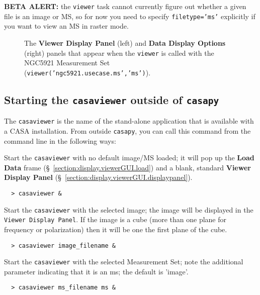 {\bf BETA ALERT:} the {\tt viewer} task cannot currently figure out whether
a given file is an image or MS, so for now you need to specify 
{\tt filetype='ms'} explicitly if you want to view an MS in raster mode.

\begin{figure}[h!]
\caption{\label{fig:viewer_start_ms} The {\bf Viewer Display Panel}
(left) and {\bf Data Display Options} (right) panels that appear when the 
{\tt viewer} is called with the NGC5921 Measurement Set
({\tt viewer('ngc5921.usecase.ms','ms')}).} 
\hrulefill
\end{figure}

\subsection{Starting the {\tt casaviewer} outside of {\tt casapy}}
\label{section:display.start.casaviewer}

The {\tt casaviewer} is the name of the stand-alone application that is
available with a CASA installation.  From outside {\tt casapy}, you
can call this command from the command line in the following ways:

Start the {\tt casaviewer} with no default image/MS loaded; it will
pop up the {\bf Load Data} frame 
(\S~\ref{section:display.viewerGUI.load}) and a blank, 
standard {\bf Viewer Display Panel} 
(\S~\ref{section:display.viewerGUI.displaypanel}).

\small
\begin{verbatim}
  > casaviewer &
\end{verbatim}
\normalsize

Start the {\tt casaviewer} with the selected image; the image will be
displayed in the {\tt Viewer Display Panel}. If the image is a cube (more
than one plane for frequency or polarization) then it will be one the
first plane of the cube.

\small
\begin{verbatim}
  > casaviewer image_filename &
\end{verbatim}
\normalsize

Start the {\tt casaviewer} with the selected Measurement Set; note the
additional parameter indicating that it is an ms; the default is
'image'.

\small
\begin{verbatim}
  > casaviewer ms_filename ms &
\end{verbatim}
\normalsize

